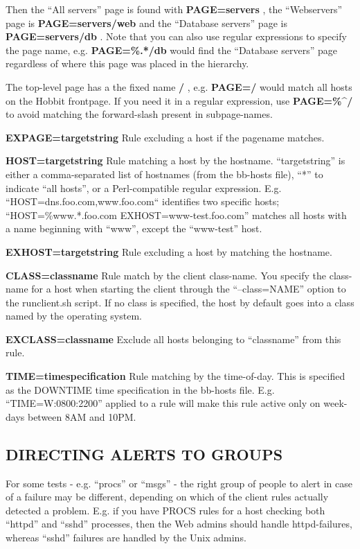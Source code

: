  Then the ``All servers'' page is found with \textbf{PAGE=servers}
, the ``Webservers'' page is \textbf{PAGE=servers/web}
 and the ``Database servers'' page is \textbf{PAGE=servers/db}
. Note that you can also use regular expressions to specify the page name, e.g. \textbf{PAGE=\%.*/db}
 would find the ``Database servers'' page regardless of where this page was placed in the hierarchy. 


  The top-level page has a the fixed name \textbf{/}
, e.g. \textbf{PAGE=/} would match all hosts on the Hobbit
  frontpage. If you need it in a regular expression, use
  \textbf{PAGE=\%\^{}/} to avoid matching the forward-slash present in
  subpage-names. 



 \textbf{EXPAGE=targetstring}
 Rule excluding a host if the pagename matches. 


 \textbf{HOST=targetstring}
 Rule matching a host by the hostname. ``targetstring'' is either a
 comma-separated list of hostnames (from the bb-hosts file), ``*'' to
 indicate ``all hosts'', or a Perl-compatible regular
 expression. E.g. ``HOST=dns.foo.com,www.foo.com`` identifies two
 specific hosts; ``HOST=\%www.*.foo.com EXHOST=www-test.foo.com''
 matches all hosts with a name beginning with ``www'', except the
 ``www-test'' host. 



 \textbf{EXHOST=targetstring}
 Rule excluding a host by matching the hostname. 


 \textbf{CLASS=classname}
 Rule match by the client class-name. You specify the class-name for a
 host when starting the client through the ``--class=NAME'' option to
 the runclient.sh script. If no class is specified, the host by
 default goes into a class named by the operating system. 



 \textbf{EXCLASS=classname}
 Exclude all hosts belonging to ``classname'' from this rule. 


 \textbf{TIME=timespecification}
 Rule matching by the time-of-day. This is specified as the DOWNTIME time specification in the bb-hosts file. E.g. ``TIME=W:0800:2200'' applied to a rule will make this rule active only on week-days between 8AM and 10PM. 


 
\subsection{DIRECTING ALERTS TO GROUPS}
 For some tests - e.g. ``procs'' or ``msgs'' - the right group of
 people to alert in case of a failure may be different, depending on
 which of the client rules actually detected a problem. E.g. if you
 have PROCS rules for a host checking both ``httpd'' and ``sshd''
 processes, then the Web admins should handle httpd-failures, whereas
 ``sshd'' failures are handled by the Unix admins. 


